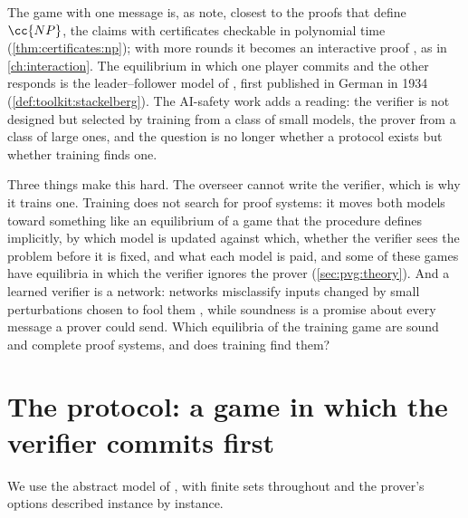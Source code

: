 \begin{refsection}
The game with one message is, as \textcite{AnilEtAl2021} note, closest to the proofs that define $\cc{NP}$, the claims with certificates checkable in polynomial time (\cref{thm:certificates:np}); with more rounds it becomes an interactive proof \parencite{GoldwasserMicaliRackoff1989,Babai1985}, as in \cref{ch:interaction}. The equilibrium in which one player commits and the other responds is the leader--follower model of \textcite{vonStackelberg2011}, first published in German in 1934 (\cref{def:toolkit:stackelberg}). The AI-safety work adds a reading: the verifier is not designed but selected by training from a class of small models, the prover from a class of large ones, and the question is no longer whether a protocol exists but whether training finds one.

Three things make this hard. The overseer cannot write the verifier, which is why it trains one. Training does not search for proof systems: it moves both models toward something like an equilibrium of a game that the procedure defines implicitly, by which model is updated against which, whether the verifier sees the problem before it is fixed, and what each model is paid, and some of these games have equilibria in which the verifier ignores the prover (\cref{sec:pvg:theory}). And a learned verifier is a network: networks misclassify inputs changed by small perturbations chosen to fool them \parencite{SzegedyEtAl2014}, while soundness is a promise about every message a prover could send. Which equilibria of the training game are sound and complete proof systems, and does training find them?

\section{The protocol: a game in which the verifier commits first}\label{sec:pvg:protocol}

We use the abstract model of \textcite[\S3.3]{AnilEtAl2021}, with finite sets throughout and the prover's options described instance by instance.


\end{refsection}
